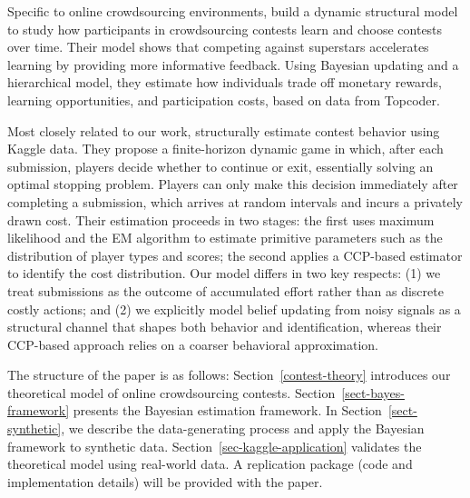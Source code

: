 \documentclass[mnsc]{informs3}
\begin{document}
Specific to online crowdsourcing environments,
\citet{zhang2019structural} build a dynamic structural model to study how participants in crowdsourcing contests learn and choose contests over time.
Their model shows that competing against superstars accelerates learning by providing more informative feedback.
Using Bayesian updating and a hierarchical model, they estimate how individuals trade off monetary rewards, learning opportunities, and participation costs, based on data from Topcoder.

Most closely related to our work, \citet{lemus2021dynamic} structurally estimate contest behavior using Kaggle data.
They propose a finite-horizon dynamic game in which, after each submission, players decide whether to continue or exit, essentially solving an optimal stopping problem.
Players can only make this decision immediately after completing a submission, which arrives at random intervals and incurs a privately drawn cost.
Their estimation proceeds in two stages: the first uses maximum likelihood and the EM algorithm to estimate primitive parameters such as the distribution of player types and scores; the second applies a CCP-based estimator to identify the cost distribution.
Our model differs in two key respects:
(1) we treat submissions as the outcome of accumulated effort rather than as discrete costly actions; and
(2) we explicitly model belief updating from noisy signals as a structural channel that shapes both behavior and identification, whereas their CCP-based approach relies on a coarser behavioral approximation.







The structure of the paper is as follows:
Section~\ref{contest-theory} introduces our theoretical model of online crowdsourcing contests.
Section~\ref{sect-bayes-framework} presents the Bayesian estimation framework.
In Section~\ref{sect-synthetic}, we describe the data-generating process and apply the Bayesian framework to synthetic data.
Section~\ref{sec-kaggle-application} validates the theoretical model using real-world data.
A replication package (code and implementation details) will be provided with the paper.
\end{document}
